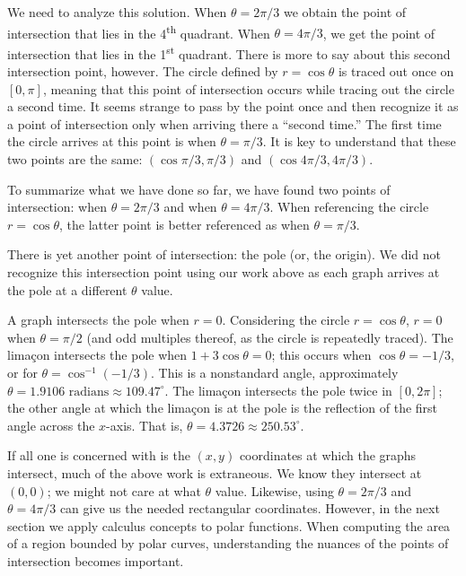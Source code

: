 \begin{example}
We need to analyze this solution. When $\theta = 2\pi/3$ we obtain the point of intersection that lies in the 4\textsuperscript{th} quadrant. When $\theta = 4\pi/3$, we get the point of intersection that lies in the 1\textsuperscript{st} quadrant. There is more to say about this second intersection point, however. The circle defined by $r=\cos\theta$ is traced out once on $[0,\pi]$, meaning that this point of intersection occurs while tracing out the circle a second time. It seems strange to pass by the point once and then recognize it as a point of intersection only when arriving there a ``second time.'' The first time the circle arrives at this point is when $\theta = \pi/3$.
It is key to understand that these two points are the same: $(\cos \pi/3,\pi/3)$ and $(\cos 4\pi/3,4\pi/3)$. 

To summarize what we have done so far, we have found two points of intersection: when $\theta=2\pi/3$ and when $\theta=4\pi/3$. When referencing the circle $r=\cos \theta$, the latter point is better referenced as when $\theta=\pi/3$.

There is yet another point of intersection: the pole (or, the origin). We did not recognize this intersection point using our work above as each graph arrives at the pole at a different $\theta$ value.

A graph intersects the pole when $r=0$. Considering the circle $r=\cos\theta$, $r=0$ when $\theta = \pi/2$ (and odd multiples thereof, as the circle is repeatedly traced). The limaçon intersects the pole when $1+3\cos\theta =0$; this occurs when $\cos \theta = -1/3$, or for $\theta = \cos^{-1}(-1/3)$. This is a nonstandard angle, approximately $\theta = 1.9106\text{ radians} \approx 109.47^\circ$. The limaçon intersects the pole twice in $[0,2\pi]$; the other angle at which the limaçon is at the pole is the reflection of the first angle across the $x$-axis. That is, $\theta = 4.3726 \approx 250.53^\circ$.
\end{example}

If all one is concerned with is the $(x,y)$ coordinates at which the graphs intersect, much of the above work is extraneous. We know they intersect at $(0,0)$; we might not care at what $\theta$ value. Likewise, using $\theta =2\pi/3$ and $\theta=4\pi/3$ can give us the needed rectangular coordinates. However, in the next section we apply calculus concepts to polar functions. When computing the area of a region bounded by polar curves, understanding the nuances of the points of intersection becomes important.

